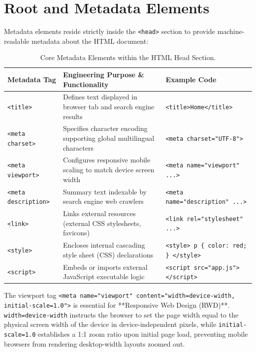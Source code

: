 \section{Root and Metadata Elements}

Metadata elements reside strictly inside the \texttt{<head>} section to provide machine-readable metadata about the HTML document:

\begin{table}[htbp]
\centering
\small
\renewcommand{\arraystretch}{1.3}
\begin{tabularx}{\linewidth}{l>{\raggedright\arraybackslash}Xl}
\toprule
\textbf{Metadata Tag} & \textbf{Engineering Purpose \& Functionality} & \textbf{Example Code} \\
\midrule
\texttt{<title>} & Defines text displayed in browser tab and search engine results & \texttt{<title>Home</title>} \\
\texttt{<meta charset>} & Specifies character encoding supporting global multilingual characters & \texttt{<meta charset="UTF-8">} \\
\texttt{<meta viewport>} & Configures responsive mobile scaling to match device screen width & \texttt{<meta name="viewport" ...>} \\
\texttt{<meta description>} & Summary text indexable by search engine web crawlers & \texttt{<meta name="description" ...>} \\
\texttt{<link>} & Links external resources (external CSS stylesheets, favicons) & \texttt{<link rel="stylesheet" ...>} \\
\texttt{<style>} & Encloses internal cascading style sheet (CSS) declarations & \texttt{<style> p \{ color: red; \} </style>} \\
\texttt{<script>} & Embeds or imports external JavaScript executable logic & \texttt{<script src="app.js"></script>} \\
\bottomrule
\end{tabularx}
\caption{Core Metadata Elements within the HTML Head Section.}
\label{tab:metadata-tags}
\end{table}

\begin{conceptbox}
The viewport tag \texttt{<meta name="viewport" content="width=device-width, initial-scale=1.0">} is essential for **Responsive Web Design (RWD)**. \texttt{width=device-width} instructs the browser to set the page width equal to the physical screen width of the device in device-independent pixels, while \texttt{initial-scale=1.0} establishes a 1:1 zoom ratio upon initial page load, preventing mobile browsers from rendering desktop-width layouts zoomed out.
\end{conceptbox}

